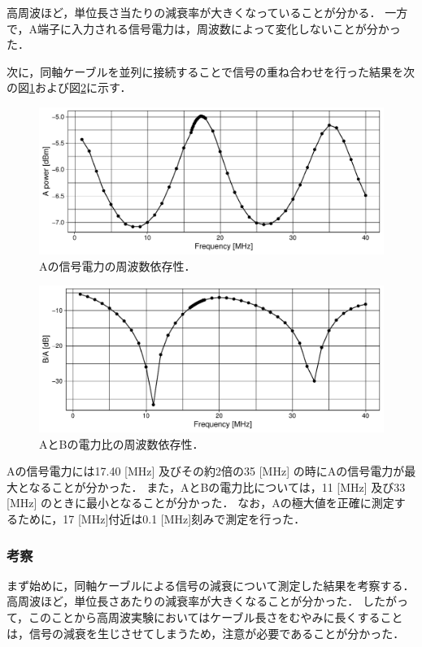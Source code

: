 \documentclass[uplatex,dvipdfmx,a4j,12pt]{jsarticle}
\begin{document}
高周波ほど，単位長さ当たりの減衰率が大きくなっていることが分かる．
一方で，A端子に入力される信号電力は，周波数によって変化しないことが分かった．


次に，同軸ケーブルを並列に接続することで信号の重ね合わせを行った結果を次の図\ref{fig:1_4}および図\ref{fig:1_5}に示す．
\begin{figure}[H]
  \centering
  \includegraphics[width=\linewidth]{data/1_2/power_vs_freq.pdf}
  \caption{Aの信号電力の周波数依存性．}
  \label{fig:1_4}
\end{figure}


\begin{figure}[H]
  \centering
  \includegraphics[width=\linewidth]{data/1_2/power_ratio_vs_freq.pdf}
  \caption{AとBの電力比の周波数依存性．}
  \label{fig:1_5}
\end{figure}

Aの信号電力には17.40 [MHz] 及びその約2倍の35 [MHz] の時にAの信号電力が最大となることが分かった．
また，AとBの電力比については，11 [MHz] 及び33 [MHz] のときに最小となることが分かった．
なお，Aの極大値を正確に測定するために，17 [MHz]付近は0.1 [MHz]刻みで測定を行った．


\subsubsection{考察}
まず始めに，同軸ケーブルによる信号の減衰について測定した結果を考察する．
高周波ほど，単位長さあたりの減衰率が大きくなることが分かった．
したがって，このことから高周波実験においてはケーブル長さをむやみに長くすることは，信号の減衰を生じさせてしまうため，注意が必要であることが分かった．
\end{document}
